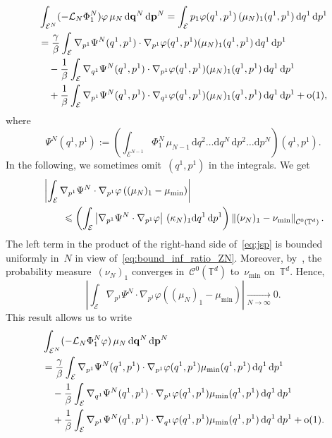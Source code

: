 \documentclass[onefignum,onetabnum]{siamart251216} %
\renewcommand{\d}{\mathrm{d}}
\newcommand{\norm}[1]{\left\lVert#1\right\rVert}
\newcommand{\torus}{\mathbb T}
\newcommand{\mc}[1]{\mathcal{#1}}
\renewcommand{\leq}{\leqslant}
\newcommand{\mescin}{\mu}
\newcommand{\mespos}{\nu}
\newcommand{\mesvit}{\kappa}
\newcommand{\vq}[1]{q^{#1}}
\newcommand{\vp}[1]{p^{#1}}
\newcommand{\vP}[1]{\mathbf{p}^{#1}}
\newcommand{\vQ}[1]{\mathbf{q}^{#1}}
\theoremstyle{plain}
\numberwithin{equation}{section}
\numberwithin{theorem}{section}
\begin{document}
\begin{align*}
    &\int_{\mc{E}^{N}}(-\mathcal{L}_N \Phi_1^N) \varphi \,\mescin_{N}\,\d \vQ{N}\,\d \vP{N}
    = \int_{\mc{E}} p_1 \varphi(\vq{1},\vp{1})\, (\mescin_N)_1(\vq{1},\vp{1})\,\d q^1\,\d p^1 \\
    &= \frac{\gamma}{\beta}\int_{\mc{E}}\nabla_{\vp{1}}\Psi^N(\vq{1},\vp{1})\cdot \nabla_{\vp{1}}\varphi(\vq{1},\vp{1}) (\mescin_N)_1(\vq{1},\vp{1})\,\d q^1\,\d p^1 \\
    &\quad - \frac{1}{\beta}\int_{\mc{E}}\nabla_{\vq{1}}\Psi^N(\vq{1},\vp{1})\cdot \nabla_{\vp{1}}\varphi(\vq{1},\vp{1})(\mescin_N)_1(\vq{1},\vp{1})\,\d q^1\,\d p^1 \\
    &\quad + \frac{1}{\beta}\int_{\mc{E}}\nabla_{\vp{1}}\Psi^N(\vq{1},\vp{1})\cdot \nabla_{\vq{1}}\varphi(\vq{1},\vp{1})(\mescin_N)_1(\vq{1},\vp{1})\,\d q^1\,\d p^1
    + \rm{o}(1),
\end{align*}
where
\[
    \Psi^N(\vq{1},\vp{1})
    := \left(\int_{\mc{E}^{N-1}}\Phi_1^N \, \mescin_{N-1}\,\d\vq{2} \dots \d \vq{N}\,\d\vp{2} \dots \d \vp{N}\right)
    (\vq{1},\vp{1}).
\]
In the following, we sometimes omit~$(\vq{1},\vp{1})$ in the integrals. We get
\begin{align}
\notag
&\left|\int_{\mc{E}}\nabla_{\vp{1}}\Psi^N\cdot \nabla_{\vp{1}}\varphi \left((\mescin_N)_1 - \mescin_{\min}\right)\right|\\
\label{eq:jsp}
&\qquad \leq \left(\int_{\mc{E}}\left|\nabla_{\vp{1}}\Psi^N\cdot \nabla_{\vp{1}}\varphi \right|\, (\mesvit_N)_1\d q^1\,\d p^1\right)\norm{(\mespos_N)_1 - \mespos_{\min}}_{\mc{C}^0(\torus^d)}.
\end{align}
The left term in the product of the right-hand side of~\eqref{eq:jsp} is bounded uniformly in~$N$ in view of~\eqref{eq:bound_inf_ratio_ZN}. Moreover, by~\cite[Section 3]{delgadino2021diffusive}, the probability measure~$(\mespos_N)_1$ converges in~$\mc{C}^0(\torus^d)$ to~$\mespos_{\min}$ on~$\torus^d$.
Hence,
\[
\left|\int_{\mc{E}}\nabla_{\vp{1}}\Psi^N\cdot \nabla_{\vp{1}}\varphi \left((\mescin_N)_1 - \mescin_{\min}\right)\right| \xrightarrow[N\to\infty]{} 0.
\]
This result allows us to write
\begin{align*}
    &\int_{\mc{E}^{N}}(-\mathcal{L}_N \Phi_1^N \varphi )\,\mescin_{N}\,\d \vQ{N}\,\d \vP{N} \\
    &= \frac{\gamma}{\beta}\int_{\mc{E}}\nabla_{\vp{1}}\Psi^N(\vq{1},\vp{1})\cdot \nabla_{\vp{1}}\varphi(\vq{1},\vp{1}) \mescin_{\min}(\vq{1},\vp{1})\,\d q^1\,\d p^1 \\
    &\quad - \frac{1}{\beta}\int_{\mc{E}}\nabla_{\vq{1}}\Psi^N(\vq{1},\vp{1})\cdot \nabla_{\vp{1}}\varphi(\vq{1},\vp{1})\mescin_{\min}(\vq{1},\vp{1})\,\d q^1\,\d p^1 \\
    &\quad + \frac{1}{\beta}\int_{\mc{E}}\nabla_{\vp{1}}\Psi^N(\vq{1},\vp{1})\cdot \nabla_{\vq{1}}\varphi(\vq{1},\vp{1}) \mescin_{\min}(\vq{1},\vp{1})\,\d q^1\,\d p^1
    + \rm{o}(1).
\end{align*}
\end{document}
